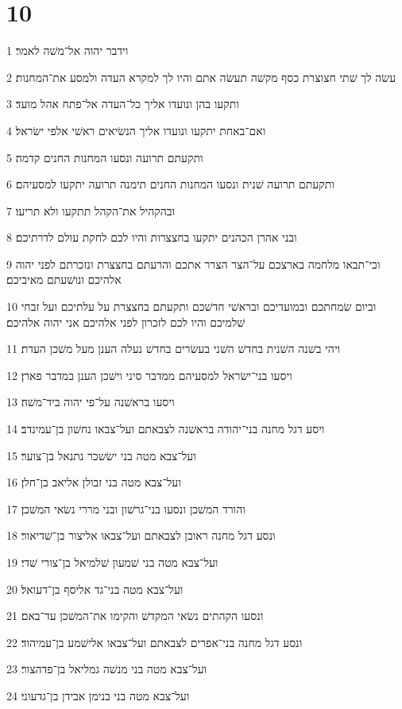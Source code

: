 \chapter{10}

\par 1 וידבר יהוה אל־משׁה לאמר׃
\par 2 עשׂה לך שׁתי חצוצרת כסף מקשׁה תעשׂה אתם והיו לך למקרא העדה ולמסע את־המחנות׃
\par 3 ותקעו בהן ונועדו אליך כל־העדה אל־פתח אהל מועד׃
\par 4 ואם־באחת יתקעו ונועדו אליך הנשׂיאים ראשׁי אלפי ישׂראל׃
\par 5 ותקעתם תרועה ונסעו המחנות החנים קדמה׃
\par 6 ותקעתם תרועה שׁנית ונסעו המחנות החנים תימנה תרועה יתקעו למסעיהם׃
\par 7 ובהקהיל את־הקהל תתקעו ולא תריעו׃
\par 8 ובני אהרן הכהנים יתקעו בחצצרות והיו לכם לחקת עולם לדרתיכם׃
\par 9 וכי־תבאו מלחמה בארצכם על־הצר הצרר אתכם והרעתם בחצצרת ונזכרתם לפני יהוה אלהיכם ונושׁעתם מאיביכם׃
\par 10 וביום שׂמחתכם ובמועדיכם ובראשׁי חדשׁכם ותקעתם בחצצרת על עלתיכם ועל זבחי שׁלמיכם והיו לכם לזכרון לפני אלהיכם אני יהוה אלהיכם׃
\par 11 ויהי בשׁנה השׁנית בחדשׁ השׁני בעשׂרים בחדשׁ נעלה הענן מעל משׁכן העדת׃
\par 12 ויסעו בני־ישׂראל למסעיהם ממדבר סיני וישׁכן הענן במדבר פארן׃
\par 13 ויסעו בראשׁנה על־פי יהוה ביד־משׁה׃
\par 14 ויסע דגל מחנה בני־יהודה בראשׁנה לצבאתם ועל־צבאו נחשׁון בן־עמינדב׃
\par 15 ועל־צבא מטה בני ישׂשכר נתנאל בן־צוער׃
\par 16 ועל־צבא מטה בני זבולן אליאב בן־חלן׃
\par 17 והורד המשׁכן ונסעו בני־גרשׁון ובני מררי נשׂאי המשׁכן׃
\par 18 ונסע דגל מחנה ראובן לצבאתם ועל־צבאו אליצור בן־שׁדיאור׃
\par 19 ועל־צבא מטה בני שׁמעון שׁלמיאל בן־צורי שׁדי׃
\par 20 ועל־צבא מטה בני־גד אליסף בן־דעואל׃
\par 21 ונסעו הקהתים נשׂאי המקדשׁ והקימו את־המשׁכן עד־באם׃
\par 22 ונסע דגל מחנה בני־אפרים לצבאתם ועל־צבאו אלישׁמע בן־עמיהוד׃
\par 23 ועל־צבא מטה בני מנשׁה גמליאל בן־פדהצור׃
\par 24 ועל־צבא מטה בני בנימן אבידן בן־גדעוני׃
